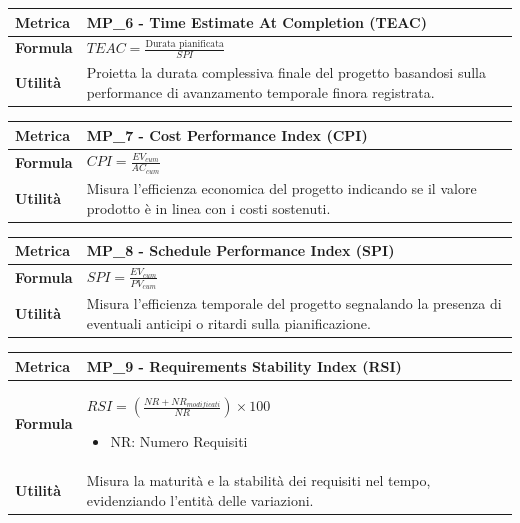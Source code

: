 \documentclass[12pt, a4paper]{article}
\begin{document}
\begin{table}[H]
\centering
\renewcommand{\arraystretch}{1.5}
\begin{tabular}{|l|p{12cm}|}
\hline
\textbf{Metrica} & MP\_6 - Time Estimate At Completion (TEAC) \\ \hline
\textbf{Formula} & $TEAC=\frac{\text{Durata pianificata}}{SPI}$ \\ \hline
\textbf{Utilità} & Proietta la durata complessiva finale del progetto basandosi sulla performance di avanzamento temporale finora registrata. \\ \hline
\end{tabular}
\end{table}

\begin{table}[H]
\centering
\renewcommand{\arraystretch}{1.5}
\begin{tabular}{|l|p{12cm}|}
\hline
\textbf{Metrica} & MP\_7 - Cost Performance Index (CPI) \\ \hline
\textbf{Formula} & $CPI=\frac{EV_{cum}}{AC_{cum}}$ \\ \hline
\textbf{Utilità} & Misura l'efficienza economica del progetto indicando se il valore prodotto è in linea con i costi sostenuti. \\ \hline
\end{tabular}
\end{table}

\begin{table}[H]
\centering
\renewcommand{\arraystretch}{1.5}
\begin{tabular}{|l|p{12cm}|}
\hline
\textbf{Metrica} & MP\_8 - Schedule Performance Index (SPI) \\ \hline
\textbf{Formula} & $SPI=\frac{EV_{cum}}{PV_{cum}}$ \\ \hline
\textbf{Utilità} & Misura l'efficienza temporale del progetto segnalando la presenza di eventuali anticipi o ritardi sulla pianificazione. \\ \hline
\end{tabular}
\end{table}


\begin{table}[H]
\centering
\renewcommand{\arraystretch}{1.5}
\begin{tabular}{|l|p{12cm}|}
\hline
\textbf{Metrica} & MP\_9 - Requirements Stability Index (RSI) \\ \hline
\textbf{Formula} & $RSI=\left(\frac{NR+NR_{modificati}}{NR}\right)\times100$ \begin{itemize}
    \item NR: Numero Requisiti
\end{itemize}\\ \hline
\textbf{Utilità} & Misura la maturità e la stabilità dei requisiti nel tempo, evidenziando l'entità delle variazioni. \\ \hline
\end{tabular}
\end{table}
\end{document}

